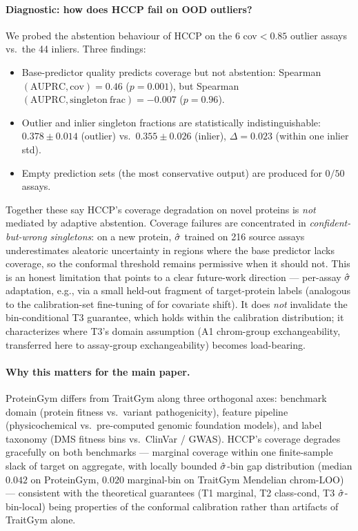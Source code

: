 \paragraph{Diagnostic: how does HCCP fail on OOD outliers?}
We probed the abstention behaviour of HCCP on the 6 cov$<0.85$ outlier assays vs.\ the 44 inliers. Three findings:
\begin{itemize}
    \item Base-predictor quality predicts coverage but not abstention: Spearman$(\mathrm{AUPRC}, \mathrm{cov}) = 0.46$ ($p = 0.001$), but Spearman$(\mathrm{AUPRC}, \mathrm{singleton\ frac}) = -0.007$ ($p = 0.96$).
    \item Outlier and inlier singleton fractions are statistically indistinguishable: $0.378 \pm 0.014$ (outlier) vs.\ $0.355 \pm 0.026$ (inlier), $\Delta = 0.023$ (within one inlier std).
    \item Empty prediction sets (the most conservative output) are produced for $0/50$ assays.
\end{itemize}
Together these say HCCP's coverage degradation on novel proteins is \emph{not} mediated by adaptive abstention. Coverage failures are concentrated in \emph{confident-but-wrong singletons}: on a new protein, $\hat{\sigma}$ trained on 216 source assays underestimates aleatoric uncertainty in regions where the base predictor lacks coverage, so the conformal threshold remains permissive when it should not. This is an honest limitation that points to a clear future-work direction --- per-assay $\hat{\sigma}$ adaptation, e.g., via a small held-out fragment of target-protein labels (analogous to the calibration-set fine-tuning of \citet{tibshirani2019weighted} for covariate shift). It does \emph{not} invalidate the bin-conditional T3 guarantee, which holds within the calibration distribution; it characterizes where T3's domain assumption (A1 chrom-group exchangeability, transferred here to assay-group exchangeability) becomes load-bearing.

\paragraph{Why this matters for the main paper.} ProteinGym differs from TraitGym along three orthogonal axes: benchmark domain (protein fitness vs.\ variant pathogenicity), feature pipeline (physicochemical vs.\ pre-computed genomic foundation models), and label taxonomy (DMS fitness bins vs.\ ClinVar / GWAS). HCCP's coverage degrades gracefully on both benchmarks --- marginal coverage within one finite-sample slack of target on aggregate, with locally bounded $\hat{\sigma}$-bin gap distribution (median $0.042$ on ProteinGym, $0.020$ marginal-bin on TraitGym Mendelian chrom-LOO) --- consistent with the theoretical guarantees (T1 marginal, T2 class-cond, T3 $\hat{\sigma}$-bin-local) being properties of the conformal calibration rather than artifacts of TraitGym alone.


